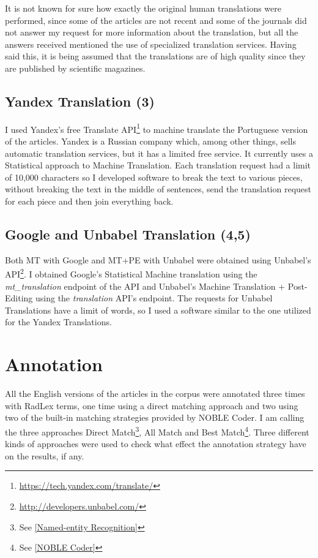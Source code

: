 It is not known for sure how exactly the original human translations were performed, since some of the articles are not recent and some of the journals did not answer my request for more information about the translation, but all the answers received mentioned the use of specialized translation services. Having said this, it is being assumed that the translations are of high quality since they are published by scientific magazines. 

\subsection{Yandex Translation (3)}

I used Yandex's free Translate API\footnote{\url{https://tech.yandex.com/translate/}} to machine translate the Portuguese version of the articles. Yandex is a Russian company which, among other things, sells automatic translation services, but it has a limited free service. It currently uses a Statistical approach to Machine Translation. Each translation request had a limit of 10,000 characters so I developed software to break the text to various pieces, without breaking the text in the middle of sentences, send the translation request for each piece and then join everything back. 

\subsection{Google and Unbabel Translation (4,5)}

Both MT with Google and MT+PE with Unbabel were obtained using Unbabel's API\footnote{\url{http://developers.unbabel.com/}}. I obtained Google’s Statistical Machine translation using the \textit{mt\_translation} endpoint of the API and Unbabel’s Machine Translation + Post-Editing using the \textit{translation} API’s endpoint.  The requests for Unbabel Translations have a limit of words, so I used a software similar to the one utilized for the Yandex Translations. 

\section{Annotation}

All the English versions of the articles in the corpus were annotated three times with RadLex terms, one time using a direct matching approach and two using two of the built-in matching strategies provided by NOBLE Coder. I am calling the three approaches Direct Match\footnote{See \ref{Named-entity Recognition}}, All Match and Best Match\footnote{See \ref{NOBLE Coder}}. Three different kinds of approaches were used to check what effect the annotation strategy have on the results, if any.

